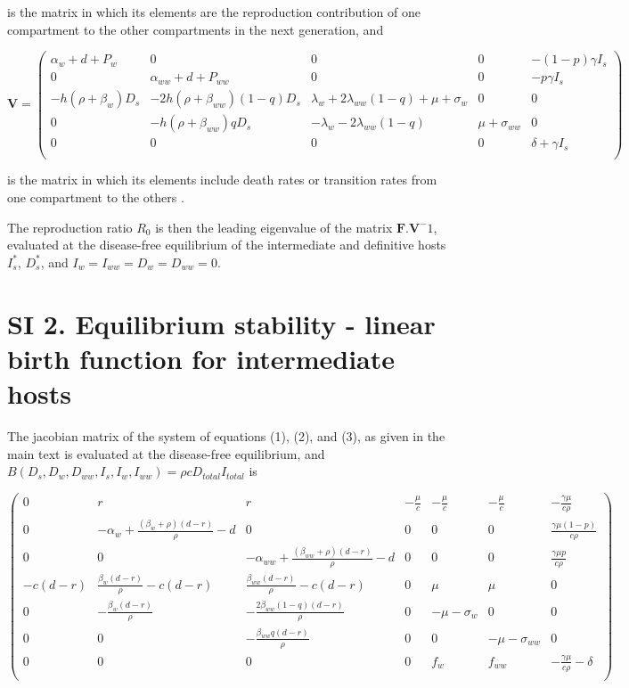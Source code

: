 \documentclass[11pt]{article}
\begin{document}
is the matrix in which its elements are the reproduction contribution of one compartment to the other compartments in the next generation, and

\[
\mathbf{V} = 
\begin{pmatrix}
\alpha_w + d + P_w  & 0 & 0 & 0 & - (1 - p) \gamma  I_s\\
 0 & \alpha_{ww} + d + P_{ww} & 0 & 0 & - p \gamma I_s \\
- h(\rho + \beta_w) D_s & -2 h(\rho + \beta_{ww})  (1 - q) D_s & \lambda_w + 2 \lambda_{ww} (1-q) + \mu + \sigma_w & 0 & 0 \\
 0 & -h (\rho + \beta_{ww}) q D_s  & -\lambda_w - 2 \lambda_{ww} (1 - q) & \mu + \sigma_{ww} & 0 \\
 0 & 0 & 0 & 0 & \delta + \gamma I_s \\
\end{pmatrix}
\]

is the matrix in which its elements include death rates or transition rates from one compartment to the others \citep{Diekmann1990, Diekmann2009, hurford:JRSI:2010}. 

The reproduction ratio $R_0$ is then the leading eigenvalue of the matrix $\mathbf{F}.\mathbf{V}^-1$, evaluated at the disease-free equilibrium of the intermediate and definitive hosts $I_s^*$, $D_s^*$, and $I_w = I_{ww} = D_w = D_{ww} = 0$.

\section*{SI 2. Equilibrium stability - linear birth function for intermediate hosts}

The jacobian matrix of the system of equations (1), (2), and (3), as given in the main text  is evaluated at the disease-free equilibrium, and $B(D_s, D_w, D_{ww}, I_s, I_w, I_{ww}) = \rho c D_{total} I_{total}$ is

\[
\begin{pmatrix}
	0 & r & r & -\frac{\mu}{c} & -\frac{\mu }{c} & -\frac{\mu }{c} & -\frac{\gamma  \mu }{c \rho } \\
	0 & -\alpha_w + \frac{(\beta_w + \rho ) (d-r)}{\rho } - d & 0 & 0 & 0 & 0 & \frac{\gamma  \mu  (1-p)}{c \rho } \\
	0 & 0 & -\alpha_{ww} + \frac{(\beta_{ww} + \rho ) (d-r)}{\rho } - d & 0 & 0 & 0 & \frac{\gamma  \mu  p}{c \rho } \\
	-c (d-r) & \frac{\beta_w (d-r)}{\rho } - c (d-r) & \frac{\beta_{ww} (d-r)}{\rho }-c (d-r) & 0 & \mu  & \mu  & 0 \\
	0 & -\frac{\beta_w (d-r)}{\rho } & -\frac{2 \beta_{ww} (1-q) (d-r)}{\rho } & 0 & -\mu - \sigma_w & 0 & 0 \\
	0 & 0 & -\frac{\beta_{ww} q (d-r)}{\rho } & 0 & 0 & -\mu - \sigma_{ww} & 0 \\
	0 & 0 & 0 & 0 & f_w & f_{ww} & -\frac{\gamma  \mu }{c \rho } - \delta  \\
\end{pmatrix}
\]
\end{document}
